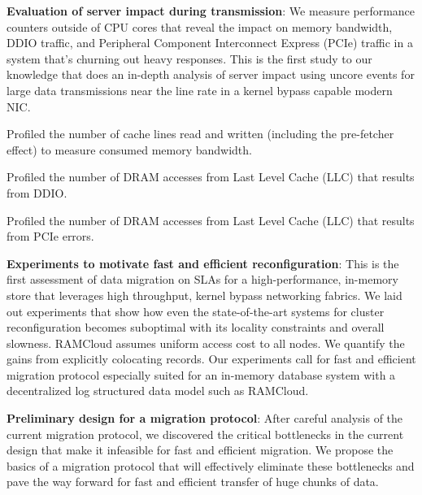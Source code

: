 \begin{myitemize}
    \item{\textbf{Evaluation of server impact during transmission}}: We measure performance counters outside of CPU cores that reveal the impact on memory bandwidth,
     DDIO traffic, and Peripheral Component Interconnect Express (PCIe) traffic in a system that's churning out heavy responses. This is the first study to our knowledge that does an 
     in-depth analysis of server impact using uncore events for large data transmissions near the line rate in a kernel bypass capable modern NIC.
     \begin{myitemize}
     \item Profiled the number of cache lines read and written (including the pre-fetcher effect) to measure consumed memory bandwidth.
     \item Profiled the number of DRAM accesses from Last Level Cache (LLC) that results from DDIO.
     \item Profiled the number of DRAM accesses from Last Level Cache (LLC) that results from PCIe errors.
     \end{myitemize}


  \item{\textbf{Experiments to motivate fast and efficient reconfiguration}}: This is the first assessment of data migration on SLAs for a high-performance,
    in-memory store that leverages high throughput, kernel bypass networking fabrics. 
   We laid out experiments that show how even the state-of-the-art systems for cluster reconfiguration becomes suboptimal with its locality constraints and overall slowness. 
   RAMCloud assumes uniform access cost to all nodes. We quantify the gains from explicitly colocating records.
   Our experiments call for fast and efficient migration protocol especially suited for an in-memory database system with a decentralized log structured data model such as RAMCloud.

  \item{\textbf{Preliminary design for a migration protocol}}: After careful analysis of the current migration protocol,
   we discovered the critical bottlenecks in the current design that make it infeasible for fast and efficient migration.
   We propose the basics of a \linebreak migration protocol that will effectively eliminate these bottlenecks and pave the way
   forward for fast and efficient transfer of huge chunks of data.

\end{myitemize}

